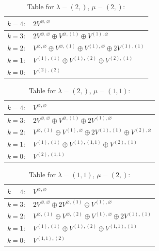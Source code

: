 \documentclass[a4paper,12pt]{article}
\begin{document}
\renewcommand{\arraystretch}{1.6} 
\begin{table}[H]
\centering
\caption{Table for $\lambda = (2,)$, $\mu = (2,)$:}
\begin{tabular}{|>{\centering\arraybackslash}p{15cm}|}
\hline
 $k = 4: \quad 2 V^{\varnothing, \varnothing} $ \\ \hline
 $k = 3: \quad 2 V^{\varnothing, \varnothing} \oplus V^{\varnothing, (1)} \oplus V^{(1), \varnothing} $ \\ \hline
 $k = 2: \quad V^{\varnothing, \varnothing} \oplus V^{\varnothing, (1)} \oplus V^{(1), \varnothing} \oplus 2 V^{(1), (1)} $ \\ \hline
 $k = 1: \quad V^{(1), (1)} \oplus V^{(1), (2)} \oplus V^{(2), (1)} $ \\ \hline
 $k = 0: \quad V^{(2), (2)} $ \\ \hline
\end{tabular}
\end{table}

\renewcommand{\arraystretch}{1.6} 
\begin{table}[H]
\centering
\caption{Table for $\lambda = (2,)$, $\mu = (1, 1)$:}
\begin{tabular}{|>{\centering\arraybackslash}p{15cm}|}
\hline
 $k = 4: \quad V^{\varnothing, \varnothing} $ \\ \hline
 $k = 3: \quad 2 V^{\varnothing, \varnothing} \oplus V^{\varnothing, (1)} \oplus 2 V^{(1), \varnothing} $ \\ \hline
 $k = 2: \quad V^{\varnothing, (1)} \oplus V^{(1), \varnothing} \oplus 2 V^{(1), (1)} \oplus V^{(2), \varnothing} $ \\ \hline
 $k = 1: \quad V^{(1), (1)} \oplus V^{(1), (1, 1)} \oplus V^{(2), (1)} $ \\ \hline
 $k = 0: \quad V^{(2), (1, 1)} $ \\ \hline
\end{tabular}
\end{table}

\renewcommand{\arraystretch}{1.6} 
\begin{table}[H]
\centering
\caption{Table for $\lambda = (1, 1)$, $\mu = (2,)$:}
\begin{tabular}{|>{\centering\arraybackslash}p{15cm}|}
\hline
 $k = 4: \quad V^{\varnothing, \varnothing} $ \\ \hline
 $k = 3: \quad 2 V^{\varnothing, \varnothing} \oplus 2 V^{\varnothing, (1)} \oplus V^{(1), \varnothing} $ \\ \hline
 $k = 2: \quad V^{\varnothing, (1)} \oplus V^{\varnothing, (2)} \oplus V^{(1), \varnothing} \oplus 2 V^{(1), (1)} $ \\ \hline
 $k = 1: \quad V^{(1), (1)} \oplus V^{(1), (2)} \oplus V^{(1, 1), (1)} $ \\ \hline
 $k = 0: \quad V^{(1, 1), (2)} $ \\ \hline
\end{tabular}
\end{table}
\end{document}
